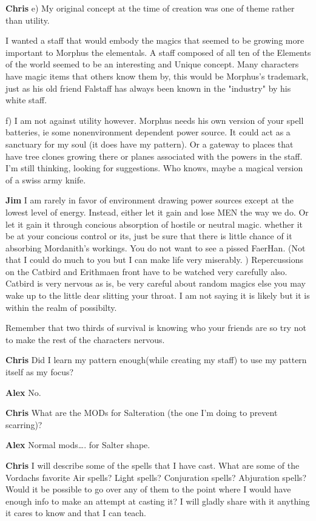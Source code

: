 {\bf Chris} 
e)	My original concept at the time of creation was one of theme rather than 
utility.

I wanted a staff that would embody the magics that seemed to be growing more
important to Morphus \- the elementals. A staff composed of all ten of the
Elements of the world seemed to be an interesting and Unique concept. Many
characters have magic items that others know them by, this would be Morphus's
trademark, just as his old friend Falstaff has always been known in the
"industry" by his white staff.

f)	I am not against utility however. Morphus needs his own version of your spell
batteries, ie some non\-environment dependent power source. It could act as a
sanctuary for my soul (it does have my pattern). Or a gateway to places that
have tree clones growing there or planes associated with the powers in the staff.
I'm still thinking, looking for suggestions. Who knows, maybe a magical version
of a swiss army knife.

{\bf Jim}
I am rarely in favor of environment drawing power sources except at the 
lowest level of energy. Instead, either let it gain and lose MEN 
the way we do. Or let it gain it through concious absorption of hostile 
or neutral magic. whether it be at your concious control or its, 
just be sure that there is little chance of it absorbing Mordanith's workings. 
You do not want to see a pissed Faer\-Han. (Not that I could do much to you but 
I can make life very miserably. ) Repercussions on the Catbird and Erithmaen 
front have to be watched very carefully also. Catbird is very nervous as is, 
be very careful about random magics else you may wake up to the little dear 
slitting your throat. I am not saying it is likely but it is within the realm 
of possibilty. 

Remember that two thirds of survival is knowing who your friends are 
so try not to make the rest of the characters nervous.

{\bf Chris} 
Did I learn my pattern enough(while creating my staff) to use my pattern 
itself as my focus?

{\bf Alex }	
No.

{\bf Chris} 
What are the MODs for Salteration (the one I'm doing to prevent scarring)?

{\bf Alex }	
Normal mods\dots. for Salter shape.

{\bf Chris} 
I will describe some of the spells that I have cast. What are some of the 
Vordachs favorite Air spells? Light spells? Conjuration spells? 
Abjuration spells? Would it be possible to go over any of them 
to the point where I would have enough info to make an attempt at casting it? 
I will gladly share with it anything it cares to know and that I can teach.

